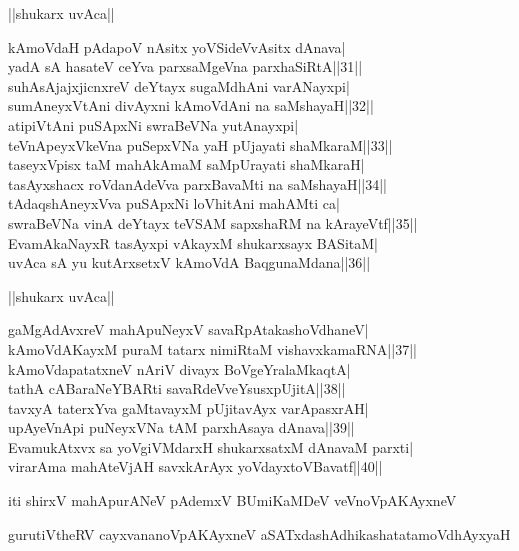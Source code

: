\documentclass{article}
\begin{document}
\begin{center}
||shukarx uvAca||
\end{center}

kAmoVdaH pAdapoV nAsitx yoVSideVvAsitx dAnava|\\
yadA sA hasateV ceYva parxsaMgeVna parxhaSiRtA||31||\\
suhAsAjajxjicnxreV deYtayx sugaMdhAni varANayxpi|\\
sumAneyxVtAni divAyxni kAmoVdAni na saMshayaH||32||\\
atipiVtAni puSApxNi swraBeVNa yutAnayxpi|\\
teVnApeyxVkeVna puSepxVNa yaH pUjayati shaMkaraM||33||\\
taseyxVpisx taM mahAkAmaM saMpUrayati shaMkaraH|\\
tasAyxshacx roVdanAdeVva parxBavaMti na saMshayaH||34||\\
tAdaqshAneyxVva puSApxNi loVhitAni mahAMti ca|\\
swraBeVNa vinA deYtayx teVSAM sapxshaRM na kArayeVtf||35||\\
EvamAkaNayxR tasAyxpi vAkayxM shukarxsayx BASitaM|\\
uvAca sA yu kutArxsetxV kAmoVdA BaqgunaMdana||36||\\

\begin{center}
||shukarx uvAca||
\end{center}

gaMgAdAvxreV mahApuNeyxV savaRpAtakashoVdhaneV|\\
kAmoVdAKayxM puraM tatarx nimiRtaM vishavxkamaRNA||37||\\
kAmoVdapatatxneV nAriV divayx BoVgeYralaMkaqtA|\\
tathA cABaraNeYBARti savaRdeVveYsusxpUjitA||38||\\
tavxyA taterxYva gaMtavayxM pUjitavAyx varApasxrAH|\\
upAyeVnApi puNeyxVNa tAM parxhAsaya dAnava||39||\\
EvamukAtxvx sa yoVgiVMdarxH shukarxsatxM dAnavaM parxti|\\
virarAma mahAteVjAH savxkArAyx yoVdayxtoVBavatf||40||

\begin{center}
iti shirxV mahApurANeV pAdemxV BUmiKaMDeV veVnoVpAKAyxneV
\end{center}

\begin{center}
gurutiVtheRV cayxvananoVpAKAyxneV aSATxdashAdhikashatatamoVdhAyxyaH
\end{center}
\end{document}
